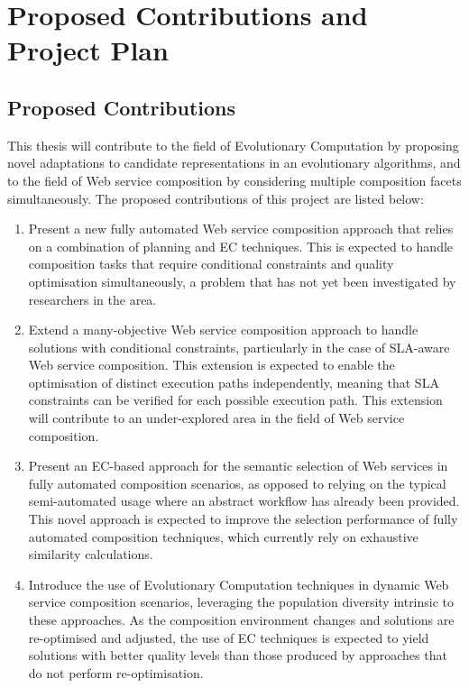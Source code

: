 \chapter{Proposed Contributions and Project Plan}\label{C:plan}

\section{Proposed Contributions}

This thesis will contribute to the field of Evolutionary Computation by proposing novel adaptations to candidate representations in an evolutionary algorithms, and to the field of Web service composition by considering multiple composition facets simultaneously. The proposed contributions of this project are listed below:

\begin{enumerate}
 \item Present a new fully automated Web service composition approach that relies on a combination of planning and EC techniques. This is expected to handle composition tasks that require conditional constraints and quality optimisation simultaneously, a problem that has not yet been investigated by researchers in the area.

 \item Extend a many-objective Web service composition approach to handle solutions with conditional constraints, particularly in the case of SLA-aware Web service composition. This extension is expected to enable the optimisation of distinct execution paths independently, meaning that SLA constraints can be verified for each possible execution path. This extension will contribute to an under-explored area in the field of Web service composition.

 \item Present an EC-based approach for the semantic selection of Web services in fully automated composition scenarios, as opposed to relying on the typical semi-automated usage where an abstract workflow has already been provided. This novel approach is expected to improve the selection performance of fully automated composition techniques, which currently rely on exhaustive similarity calculations.

 \item Introduce the use of Evolutionary Computation techniques in dynamic Web service composition scenarios, leveraging the population diversity intrinsic to these approaches.
 As the composition environment changes and solutions are re-optimised and adjusted, the use of EC techniques is expected to yield solutions with better quality levels than those produced by approaches that do not perform re-optimisation.
\end{enumerate}

